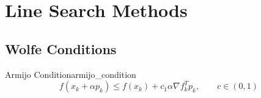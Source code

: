 \chapter{Line Search Methods}

\section{Wolfe Conditions}

\begin{condition}{Armijo Condition}{armijo_condition}
	\[
    f(x_{k}+\alpha p_{k})\leq f(x_{k})+c_{1}\alpha \nabla f_{k}^{T}p_{k}, \qquad c\in(0,1)
    \]
\end{condition}